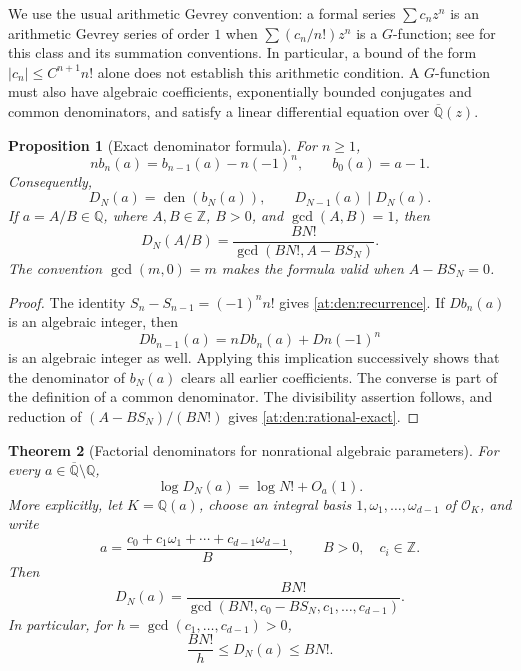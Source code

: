 \documentclass[11pt,a4paper]{article}
\newcommand{\Q}{\mathbb Q}
\newcommand{\Z}{\mathbb Z}
\newcommand{\Qbar}{\overline{\mathbb Q}}
\newtheorem{theorem}{Theorem}[section]
\newtheorem{proposition}[theorem]{Proposition}
\theoremstyle{definition}
\theoremstyle{remark}
\numberwithin{equation}{section}
\begin{document}
We use the usual arithmetic Gevrey convention: a formal series
$\sum c_nz^n$ is an arithmetic Gevrey series of order $1$ when
$\sum(c_n/n!)z^n$ is a $G$-function; see
\cite{pm:FischlerRivoal2024} for this class and its summation conventions.
In particular, a bound of the form $|c_n|\leq C^{n+1}n!$ alone does
not establish this arithmetic condition.  A $G$-function must also have
algebraic coefficients, exponentially bounded conjugates and common
denominators, and satisfy a linear differential equation over $\Qbar(z)$.

\begin{proposition}[Exact denominator formula]\label{at:den:exact}
For $n\geq1$,
\begin{equation}\label{at:den:recurrence}
 nb_n(a)=b_{n-1}(a)-n(-1)^n,
 \qquad b_0(a)=a-1.
\end{equation}
Consequently,
\begin{equation}\label{at:den:nested}
 D_N(a)=\operatorname{den}(b_N(a)),
 \qquad D_{N-1}(a)\mid D_N(a).
\end{equation}
If $a=A/B\in\Q$, where $A,B\in\Z$, $B>0$, and $\gcd(A,B)=1$, then
\begin{equation}\label{at:den:rational-exact}
 D_N(A/B)=\frac{BN!}{\gcd(BN!,A-BS_N)}.
\end{equation}
The convention $\gcd(m,0)=m$ makes the formula valid when $A-BS_N=0$.
\end{proposition}

\begin{proof}
The identity $S_n-S_{n-1}=(-1)^n n!$ gives
\eqref{at:den:recurrence}.  If $Db_n(a)$ is an algebraic integer, then
\[
 Db_{n-1}(a)=nDb_n(a)+Dn(-1)^n
\]
is an algebraic integer as well.  Applying this implication successively
shows that the denominator of $b_N(a)$ clears all earlier coefficients.
The converse is part of the definition of a common denominator.  The
divisibility assertion follows, and reduction of
$(A-BS_N)/(BN!)$ gives \eqref{at:den:rational-exact}.
\end{proof}

\begin{theorem}[Factorial denominators for nonrational algebraic parameters]
\label{at:den:algebraic-factorial}
For every $a\in\Qbar\setminus\Q$,
\begin{equation}\label{at:den:factorial-growth}
 \log D_N(a)=\log N!+O_a(1).
\end{equation}
More explicitly, let $K=\Q(a)$, choose an integral basis
$1,\omega_1,\ldots,\omega_{d-1}$ of $\mathcal O_K$, and write
\[
 a=\frac{c_0+c_1\omega_1+\cdots+c_{d-1}\omega_{d-1}}{B},
 \qquad B>0,\quad c_i\in\Z.
\]
Then
\begin{equation}\label{at:den:integral-basis-formula}
 D_N(a)=
 \frac{BN!}{\gcd(BN!,c_0-BS_N,c_1,\ldots,c_{d-1})}.
\end{equation}
In particular, for $h=\gcd(c_1,\ldots,c_{d-1})>0$,
\begin{equation}\label{at:den:factorial-two-sided}
 \frac{BN!}{h}\leq D_N(a)\leq BN!.
\end{equation}
\end{theorem}
\end{document}
